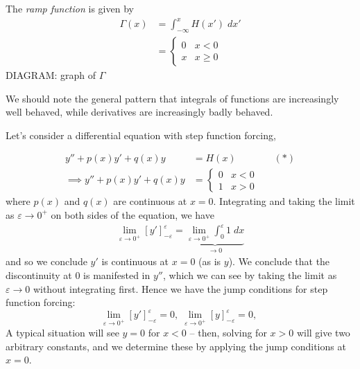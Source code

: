 \documentclass{../template/note}
\begin{document}

    \begin{definition}
        The \emph{ramp function} is given by
        \begin{align*}
            \Gamma(x) &= \int_{-\infty}^x H(x') \; dx' \\
            &= \begin{cases}
                0 & x < 0 \\
                x & x \geq 0
            \end{cases}
        \end{align*}
        DIAGRAM: graph of \(\Gamma\)
    \end{definition}
    
    \begin{remark*}
        We should note the general pattern that integrals of functions are increasingly well behaved, while derivatives are increasingly badly behaved.
    \end{remark*}
    
    Let's consider a differential equation with step function forcing,

    \begin{align*}
        y'' + p(x)y' + q(x)y &= H(x) && (*) \\
        \implies y'' + p(x)y' + q(x)y &= \begin{cases}
            0 & x < 0 \\
            1 & x > 0
        \end{cases}
    \end{align*}
    where \(p(x)\) and \(q(x)\) are continuous at \(x=0\). Integrating and taking the limit as \(\varepsilon \to 0^+\) on both sides of the equation, we have
    \begin{align*}
        \lim_{\varepsilon \to 0^+} [y']_{-\varepsilon}^\varepsilon = \underbrace{\lim_{\varepsilon \to 0^+} \int_0^\varepsilon 1 \; dx}_{\to 0}
    \end{align*}
    and so we conclude \(y'\) is continuous at \(x=0\) (as is \(y\)). We conclude that the discontinuity at 0 is manifested in \(y''\), which we can see by taking the limit as \(\varepsilon \to 0\) without integrating first. Hence we have the jump conditions for step function forcing:
    \[
        \lim_{\varepsilon \to 0^+} [y']_{-\varepsilon}^\varepsilon = 0, \; 
        \lim_{\varepsilon \to 0^+} [y]_{-\varepsilon}^\varepsilon = 0, \; 
    \]
    A typical situation will see \(y=0\) for \(x < 0\) -- then, solving for \(x>0\) will give two arbitrary constants, and we determine these by applying the jump conditions at \(x = 0\).
\end{document}

